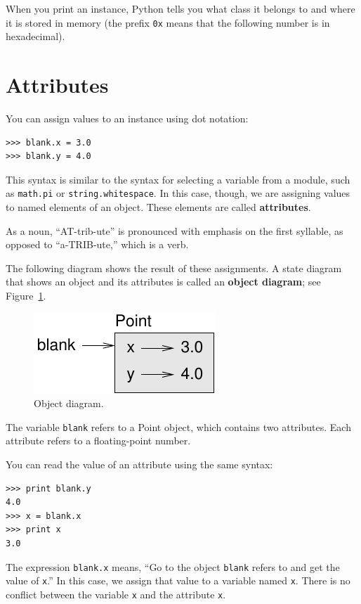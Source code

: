 \documentclass[10pt]{book}
\begin{document}
When you print an instance, Python tells you what class it
belongs to and where it is stored in memory (the prefix
{\tt 0x} means that the following number is in hexadecimal).


\section{Attributes}
\label{attributes}

You can assign values to an instance using dot notation:

\begin{verbatim}
>>> blank.x = 3.0
>>> blank.y = 4.0
\end{verbatim}
%
This syntax is similar to the syntax for selecting a variable from a
module, such as {\tt math.pi} or {\tt string.whitespace}.  In this case,
though, we are assigning values to named elements of an object.
These elements are called {\bf attributes}.

As a noun, ``AT-trib-ute'' is pronounced with emphasis on the first
syllable, as opposed to ``a-TRIB-ute,'' which is a verb.

The following diagram shows the result of these assignments.
A state diagram that shows an object and its attributes is
called an {\bf object diagram}; see Figure~\ref{fig.point}.

\begin{figure}
\centerline
{\includegraphics[scale=0.8]{figs/point.pdf}}
\caption{Object diagram.}
\label{fig.point}
\end{figure}


The variable {\tt blank} refers to a Point object, which
contains two attributes.  Each attribute refers to a
floating-point number.

You can read the value of an attribute using the same syntax:

\begin{verbatim}
>>> print blank.y
4.0
>>> x = blank.x
>>> print x
3.0
\end{verbatim}
%
The expression {\tt blank.x} means, ``Go to the object {\tt blank}
refers to and get the value of {\tt x}.'' In this case, we assign that
value to a variable named {\tt x}.  There is no conflict between
the variable {\tt x} and the attribute {\tt x}.
\end{document}
